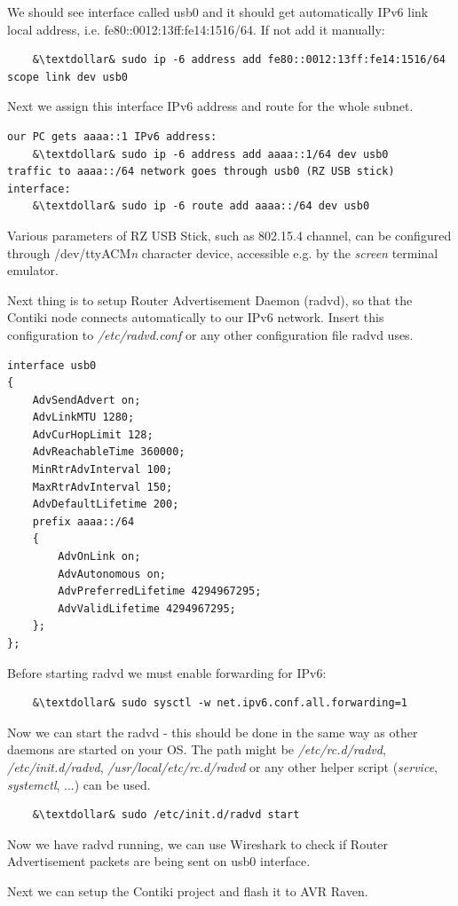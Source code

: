 \documentclass{article}
\begin{document}
We should see interface called usb0 and it should get automatically IPv6 link local address, i.e. fe80::0012:13ff:fe14:1516/64.
If not add it manually:
\begin{lstlisting}
	&\textdollar& sudo ip -6 address add fe80::0012:13ff:fe14:1516/64 scope link dev usb0
\end{lstlisting}
Next we assign this interface IPv6 address and route for the whole subnet.
\begin{lstlisting}
our PC gets aaaa::1 IPv6 address:
	&\textdollar& sudo ip -6 address add aaaa::1/64 dev usb0
traffic to aaaa::/64 network goes through usb0 (RZ USB stick) interface:
	&\textdollar& sudo ip -6 route add aaaa::/64 dev usb0
\end{lstlisting}
Various parameters of RZ USB Stick, such as 802.15.4 channel,
can be configured through /dev/ttyACM{\it{n}} character device,
accessible e.g. by the {\it{screen}} terminal emulator.


Next thing is to setup Router Advertisement Daemon (radvd), so that the Contiki node connects automatically to our IPv6 network.
Insert this configuration to {\it{/etc/radvd.conf}} or any other configuration file radvd uses.
\begin{lstlisting}
interface usb0
{
    AdvSendAdvert on;
    AdvLinkMTU 1280;
    AdvCurHopLimit 128;
    AdvReachableTime 360000;
    MinRtrAdvInterval 100;
    MaxRtrAdvInterval 150;
    AdvDefaultLifetime 200;
    prefix aaaa::/64
    {
        AdvOnLink on;
        AdvAutonomous on;
        AdvPreferredLifetime 4294967295;
        AdvValidLifetime 4294967295;
    };
};
\end{lstlisting}
Before starting radvd we must enable forwarding for IPv6:
\begin{lstlisting}
	&\textdollar& sudo sysctl -w net.ipv6.conf.all.forwarding=1
\end{lstlisting}
Now we can start the radvd - this should be done in the same way as other daemons are started on your OS.
The path might be {\it{/etc/rc.d/radvd}}, {\it{/etc/init.d/radvd}}, {\it{/usr/local/etc/rc.d/radvd}}
or any other helper script ({\it{service}}, {\it{systemctl}}, ...) can be used.
\begin{lstlisting}
	&\textdollar& sudo /etc/init.d/radvd start
\end{lstlisting}

Now we have radvd running, we can use Wireshark to check if Router Advertisement packets are being sent on usb0 interface.


Next we can setup the Contiki project and flash it to AVR Raven.
\end{document}
